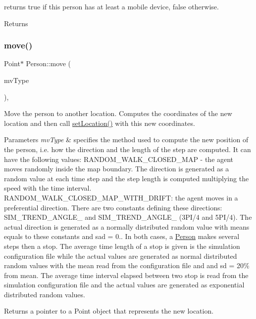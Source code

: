 returns true if this person has at least a mobile device, false otherwise. \begin{DoxyReturn}{Returns}

\end{DoxyReturn}
\mbox{\label{class_person_a89843e85f14abc08422273c20252ae23}} 
\subsubsection{\texorpdfstring{move()}{move()}}
{\footnotesize\ttfamily Point$\ast$ Person\+::move (\begin{DoxyParamCaption}\item[{\mbox{\hyperlink{_movement_type_8h_a8a93b61bc797a7d1907f42796a252493}{Movement\+Type}}}]{mv\+Type }\end{DoxyParamCaption})\hspace{0.3cm}{\ttfamily [override]}, {\ttfamily [virtual]}}

Move the person to another location. Computes the coordinates of the new location and then call \mbox{\hyperlink{class_person_a05f4ac2107d59e03f0f336eda08aa358}{set\+Location()}} with this new coordinates. 
\begin{DoxyParams}{Parameters}
{\em mv\+Type} & specifies the method used to compute the new position of the person, i.\+e. how the direction and the length of the step are computed. It can have the following values\+: R\+A\+N\+D\+O\+M\+\_\+\+W\+A\+L\+K\+\_\+\+C\+L\+O\+S\+E\+D\+\_\+\+M\+AP -\/ the agent moves randomly inside the map boundary. The direction is generated as a random value at each time step and the step length is computed multiplying the speed with the time interval. R\+A\+N\+D\+O\+M\+\_\+\+W\+A\+L\+K\+\_\+\+C\+L\+O\+S\+E\+D\+\_\+\+M\+A\+P\+\_\+\+W\+I\+T\+H\+\_\+\+D\+R\+I\+FT\+: the agent moves in a preferential direction. There are two constants defining these directions\+: S\+I\+M\+\_\+\+T\+R\+E\+N\+D\+\_\+\+A\+N\+G\+L\+E\+\_ and S\+I\+M\+\_\+\+T\+R\+E\+N\+D\+\_\+\+A\+N\+G\+L\+E\+\_ (3P\+I/4 and 5P\+I/4). The actual direction is generated as a normally distributed random value with means equals to these constants and sad = 0.. In both cases, a \mbox{\hyperlink{class_person}{Person}} makes several steps then a stop. The average time length of a stop is given is the simulation configuration file while the actual values are generated as normal distributed random values with the mean read from the configuration file and and sd = 20\% from mean. The average time interval elapsed between two stop is read from the simulation configuration file and the actual values are generated as exponential distributed random values. \\
\hline
\end{DoxyParams}
\begin{DoxyReturn}{Returns}
a pointer to a Point object that represents the new location. 
\end{DoxyReturn}


